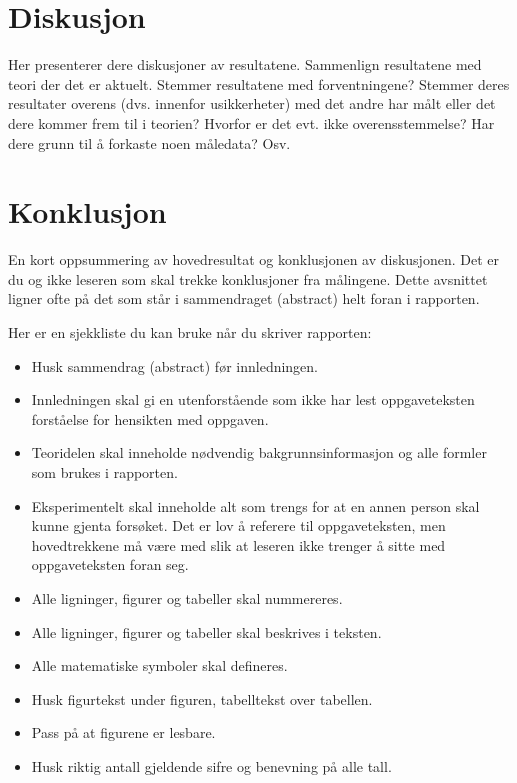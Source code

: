 \documentclass[norsk,a4paper,12pt]{article}
\begin{document}
\section{Diskusjon}
Her presenterer dere diskusjoner av resultatene. Sammenlign
resultatene med teori der det er aktuelt. Stemmer resultatene med
forventningene? Stemmer deres resultater overens (dvs. innenfor
usikkerheter) med det andre har målt eller det dere kommer frem til i
teorien? Hvorfor er det evt. ikke overensstemmelse? Har dere grunn til
å forkaste noen måledata? Osv.

\section{Konklusjon}
En kort oppsummering av hovedresultat og konklusjonen av
diskusjonen. Det er du og ikke leseren som skal trekke konklusjoner
fra målingene.  Dette avsnittet ligner ofte på det som står i
sammendraget (abstract) helt foran i rapporten.

Her er en sjekkliste du kan bruke når du skriver rapporten: 
\begin{itemize}
\item Husk sammendrag (abstract) før innledningen.
\item Innledningen skal gi en utenforstående som ikke har lest oppgaveteksten forståelse for hensikten med oppgaven. 
\item Teoridelen skal inneholde nødvendig bakgrunnsinformasjon og alle formler som brukes i rapporten.
\item Eksperimentelt skal inneholde alt som trengs for at en annen person skal kunne gjenta forsøket. Det er lov å referere til oppgaveteksten, men hovedtrekkene må være med slik at leseren ikke trenger å sitte med oppgaveteksten foran seg. 
\item Alle ligninger, figurer og tabeller skal nummereres.
\item Alle ligninger, figurer og tabeller skal beskrives i teksten. 
\item Alle matematiske symboler skal defineres. 
\item Husk figurtekst under figuren, tabelltekst over tabellen. 
\item Pass på at figurene er lesbare. 
\item Husk riktig antall gjeldende sifre og benevning på alle tall. 
\end{itemize}



\end{document}
